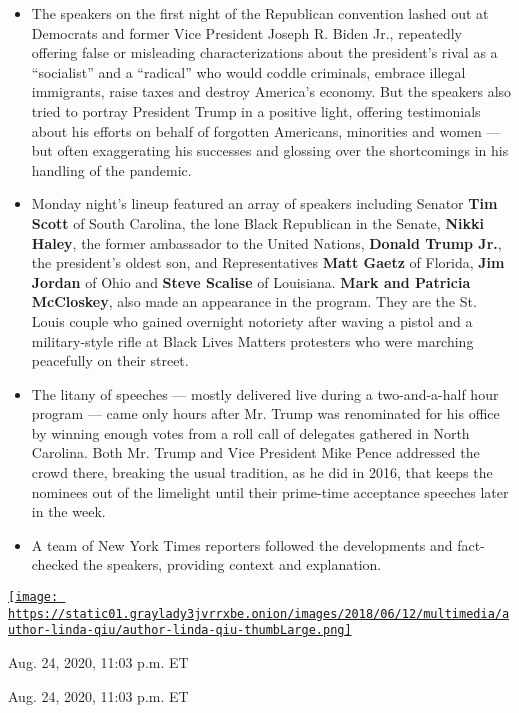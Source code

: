 \begin{itemize}
\item
  The speakers on the first night of the Republican convention lashed
  out at Democrats and former Vice President Joseph R. Biden Jr.,
  repeatedly offering false or misleading characterizations about the
  president's rival as a ``socialist'' and a ``radical'' who would
  coddle criminals, embrace illegal immigrants, raise taxes and destroy
  America's economy. But the speakers also tried to portray President
  Trump in a positive light, offering testimonials about his efforts on
  behalf of forgotten Americans, minorities and women --- but often
  exaggerating his successes and glossing over the shortcomings in his
  handling of the pandemic. 
\item
  Monday night's lineup featured an array of speakers including Senator
  \textbf{Tim Scott} of South Carolina, the lone Black Republican in the
  Senate, \textbf{Nikki Haley}, the former ambassador to the United
  Nations, \textbf{Donald Trump Jr.}, the president's oldest son, and
  Representatives \textbf{Matt Gaetz} of Florida, \textbf{Jim Jordan} of
  Ohio and \textbf{Steve Scalise} of Louisiana. \textbf{Mark and
  Patricia McCloskey}, also made an appearance in the program. They are
  the St. Louis couple who gained overnight notoriety after waving a
  pistol and a military-style rifle at Black Lives Matters protesters
  who were marching peacefully on their street.
\item
  The litany of speeches --- mostly delivered live during a
  two-and-a-half hour program --- came only hours after Mr. Trump was
  renominated for his office by winning enough votes from a roll call of
  delegates gathered in North Carolina. Both Mr. Trump and Vice
  President Mike Pence addressed the crowd there, breaking the usual
  tradition, as he did in 2016, that keeps the nominees out of the
  limelight until their prime-time acceptance speeches later in the
  week.
\item
  A team of New York Times reporters followed the developments and
  fact-checked the speakers, providing context and explanation.
\end{itemize}

\href{https://www.nytimes3xbfgragh.onion/by/linda-qiu}{\texttt{[image: https://static01.graylady3jvrrxbe.onion/images/2018/06/12/multimedia/author-linda-qiu/author-linda-qiu-thumbLarge.png]}}

Aug. 24, 2020, 11:03 p.m. ET

Aug. 24, 2020, 11:03 p.m. ET

